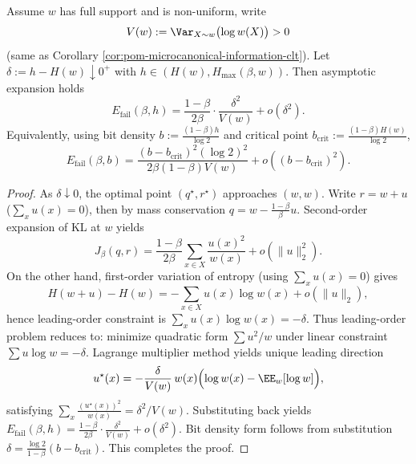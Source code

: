 \begin{theorem}\label{thm:pom-microcanonical-two-temperature-critical-quadratic-law}
Assume \(w\) has full support and is non-uniform, write
\[
V(w):=\Var_{X\sim w}\bigl(\log w(X)\bigr)>0
\]
(same as Corollary \ref{cor:pom-microcanonical-information-clt}).
Let \(\delta:=h-H(w)\downarrow 0^+\) with \(h\in(H(w),H_{\max}(\beta,w))\).
Then asymptotic expansion holds
\[
E_{\mathrm{fail}}(\beta,h)
=\frac{1-\beta}{2\beta}\cdot \frac{\delta^2}{V(w)}+o(\delta^2).
\]
Equivalently, using bit density
\(
b:=\frac{(1-\beta)h}{\log 2}
\)
and critical point
\(
b_{\mathrm{crit}}:=\frac{(1-\beta)H(w)}{\log 2}
\),
\[
E_{\mathrm{fail}}(\beta,b)
=\frac{(b-b_{\mathrm{crit}})^2(\log 2)^2}{2\beta(1-\beta)V(w)}+o\!\left((b-b_{\mathrm{crit}})^2\right).
\]
\end{theorem}
\begin{proof}
As \(\delta\downarrow 0\), the optimal point \((q^\star,r^\star)\) approaches \((w,w)\).
Write \(r=w+u\) (\(\sum_x u(x)=0\)), then by mass conservation \(q=w-\frac{1-\beta}{\beta}u\).
Second-order expansion of KL at \(w\) yields
\[
J_\beta(q,r)
=\frac{1-\beta}{2\beta}\sum_{x\in X}\frac{u(x)^2}{w(x)}+o(\|u\|_2^2).
\]
On the other hand, first-order variation of entropy (using \(\sum_x u(x)=0\)) gives
\[
H(w+u)-H(w)=-\sum_{x\in X}u(x)\log w(x)+o(\|u\|_2),
\]
hence leading-order constraint is \(\sum_x u(x)\log w(x)=-\delta\).
Thus leading-order problem reduces to: minimize quadratic form \(\sum u^2/w\) under linear constraint \(\sum u\log w=-\delta\).
Lagrange multiplier method yields unique leading direction
\[
u^\star(x)=-\frac{\delta}{V(w)}\,w(x)\Bigl(\log w(x)-\EE_w[\log w]\Bigr),
\]
satisfying
\(
\sum_x\frac{(u^\star(x))^2}{w(x)}=\delta^2/V(w)
\).
Substituting back yields
\(
E_{\mathrm{fail}}(\beta,h)=\frac{1-\beta}{2\beta}\cdot \frac{\delta^2}{V(w)}+o(\delta^2)
\).
Bit density form follows from substitution \(\delta=\frac{\log 2}{1-\beta}(b-b_{\mathrm{crit}})\). This completes the proof.
\end{proof}




